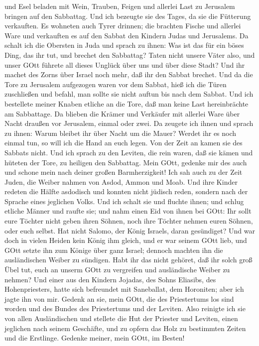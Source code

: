 und Esel beladen mit Wein, Trauben, Feigen und allerlei Last zu
Jerusalem bringen auf den Sabbattag. Und ich bezeugte sie des Tages, da
sie die Fütterung verkauften.  Es wohneten auch Tyrer
drinnen; die brachten Fische und allerlei Ware und verkauften es auf den
Sabbat den Kindern Judas und Jerusalems.  Da schalt ich die
Obersten in Juda und sprach zu ihnen: Was ist das für ein böses Ding,
das ihr tut, und brechet den Sabbattag?  Taten nicht unsere
Väter also, und unser GOtt führete all dieses Unglück über uns und über
diese Stadt? Und ihr machet des Zorns über Israel noch mehr, daß ihr den
Sabbat brechet.  Und da die Tore zu Jerusalem aufgezogen
waren vor dem Sabbat, hieß ich die Türen zuschließen und befahl, man
sollte sie nicht auftun bis nach dem Sabbat. Und ich bestellete meiner
Knaben etliche an die Tore, daß man keine Last hereinbrächte am
Sabbattage.  Da blieben die Krämer und Verkäufer mit
allerlei Ware über Nacht draußen vor Jerusalem, einmal oder zwei.
 Da zeugete ich ihnen und sprach zu ihnen: Warum bleibet
ihr über Nacht um die Mauer? Werdet ihr es noch einmal tun, so will ich
die Hand an euch legen. Von der Zeit an kamen sie des Sabbats nicht.
 Und ich sprach zu den Leviten, die rein waren, daß sie
kämen und hüteten der Tore, zu heiligen den Sabbattag. Mein GOtt,
gedenke mir des auch und schone mein nach deiner großen Barmherzigkeit!
 Ich sah auch zu der Zeit Juden, die Weiber nahmen von
Asdod, Ammon und Moab.  Und ihre Kinder redeten die Hälfte
asdodisch und konnten nicht jüdisch reden, sondern nach der Sprache
eines jeglichen Volks.  Und ich schalt sie und fluchte
ihnen; und schlug etliche Männer und raufte sie; und nahm einen Eid von
ihnen bei GOtt: Ihr sollt eure Töchter nicht geben ihren Söhnen, noch
ihre Töchter nehmen euren Söhnen, oder euch selbst.  Hat
nicht Salomo, der König Israels, daran gesündiget? Und war doch in
vielen Heiden kein König ihm gleich, und er war seinem GOtt lieb, und
GOtt setzte ihn zum Könige über ganz Israel; dennoch machten ihn die
ausländischen Weiber zu sündigen.  Habt ihr das nicht
gehöret, daß ihr solch groß Übel tut, euch an unserm GOtt zu vergreifen
und ausländische Weiber zu nehmen?  Und einer aus den
Kindern Jojadas, des Sohns Eliasibs, des Hohenpriesters, hatte sich
befreundet mit Saneballat, dem Horoniten; aber ich jagte ihn von mir.
 Gedenk an sie, mein GOtt, die des Priestertums los sind
worden und des Bundes des Priestertums und der Leviten. 
Also reinigte ich sie von allen Ausländischen und stellete die Hut der
Priester und Leviten, einen jeglichen nach seinem Geschäfte,
 und zu opfern das Holz zu bestimmten Zeiten und die
Erstlinge. Gedenke meiner, mein GOtt, im Besten!

